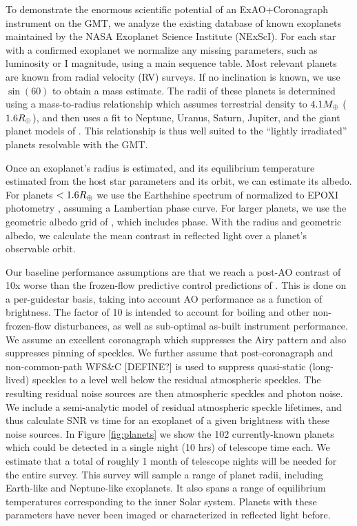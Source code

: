 \documentclass[12pt,preprint]{aastex}
\begin{document}
To demonstrate the enormous scientific potential of an ExAO+Coronagraph instrument on the GMT, we analyze the existing database of known exoplanets maintained by the NASA Exoplanet Science Institute (NExScI).  For each star with a confirmed exoplanet we normalize any missing parameters, such as luminosity or I magnitude, using a main sequence table.  Most relevant planets are known from radial velocity (RV) surveys.  If no inclination is known, we use $\sin(60)$ to obtain a mass estimate.  The radii of these planets is determined using a mass-to-radius relationship which assumes terrestrial density to $4.1 M_\oplus$ ($1.6 R_\oplus$), and then uses a fit to Neptune, Uranus, Saturn, Jupiter, and the giant planet models of \citet{2007ApJ...659.1661F}.  This relationship is thus well suited to the “lightly irradiated” planets resolvable with the GMT.

Once an exoplanet’s radius is estimated, and its equilibrium temperature estimated from the host star parameters and its orbit, we can estimate its albedo.  For planets $< 1.6 R_\oplus$ we use the Earthshine spectrum of \citet{2006ApJ...644..551T} normalized to EPOXI photometry \citep{2013ApJ...765L..17C}, assuming a Lambertian phase curve. For larger planets, we use the geometric albedo grid of \citet{2010ApJ...724..189C}, which includes phase.  With the radius and geometric albedo, we calculate the mean contrast in reflected light over a planet’s observable orbit.	

Our baseline performance assumptions are that we reach a post-AO contrast of 10x worse than the frozen-flow predictive control predictions of \citet{2018JATIS...4a9001M}.  This is done on a per-guidestar basis, taking into account AO performance as a function of brightness.  The factor of 10 is intended to account for boiling and other non-frozen-flow disturbances, as well as sub-optimal as-built instrument performance. We assume an excellent coronagraph which suppresses the Airy pattern and also suppresses pinning of speckles.   We further assume that post-coronagraph and non-common-path WFS\&C [DEFINE?] is used to suppress quasi-static (long-lived) speckles to a level well below the residual atmospheric speckles.  The resulting residual noise sources are then atmospheric speckles and photon noise.  We include a semi-analytic model of residual atmospheric speckle lifetimes, and thus calculate SNR vs time for an exoplanet of a given brightness with these noise sources.
In Figure \ref{fig:planets} we show the 102 currently-known planets which could be detected in a single night (10 hrs) of telescope time each.  We estimate that a total of roughly 1 month of telescope nights will be needed for the entire survey.  This survey will sample a range of planet radii, including Earth-like and Neptune-like exoplanets.  It also spans a range of equilibrium temperatures corresponding to the inner Solar system.  Planets with these parameters have never been imaged or characterized in reflected light before.
\end{document}
